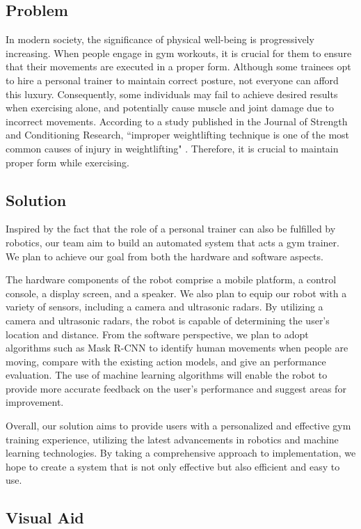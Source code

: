 \subsection{Problem}
In modern society, the significance of physical well-being is progressively increasing. 
When people engage in gym workouts, it is crucial for them to ensure that their movements are executed in a proper form. 
Although some trainees opt to hire a personal trainer to maintain correct posture, not everyone can afford this luxury. 
Consequently, some individuals may fail to achieve desired results when exercising alone, and potentially cause muscle and joint damage due to incorrect movements. 
According to a study published in the Journal of Strength and Conditioning Research, ``improper weightlifting technique is one of the  most common causes of injury in weightlifting" \cite{keogh2006injury}. 
Therefore, it is crucial to maintain proper form while exercising.

\subsection{Solution}
Inspired by the fact \cite{li2019real,liu2021robotics} that the role of a personal trainer can also be fulfilled by robotics, our team aim to build an automated system that acts a gym trainer. 
We plan to achieve our goal from both the hardware and software aspects.

The hardware components of the robot comprise a mobile platform, a control console, a display screen, and a speaker. 
We also plan to equip our robot with a variety of sensors, including a camera and ultrasonic radars. 
By utilizing a camera and ultrasonic radars, the robot is capable of determining the user's location and distance.
From the software perspective, we plan to adopt algorithms such as Mask R-CNN to identify human movements when people are moving, compare with the existing action models, and give an performance evaluation. 
The use of machine learning algorithms will enable the robot to provide more accurate feedback on the user's performance and suggest areas for improvement.

Overall, our solution aims to provide users with a personalized and effective gym training experience, utilizing the latest advancements in robotics and machine learning technologies. 
By taking a comprehensive approach to implementation, we hope to create a system that is not only effective but also efficient and easy to use.

\subsection{Visual Aid}

